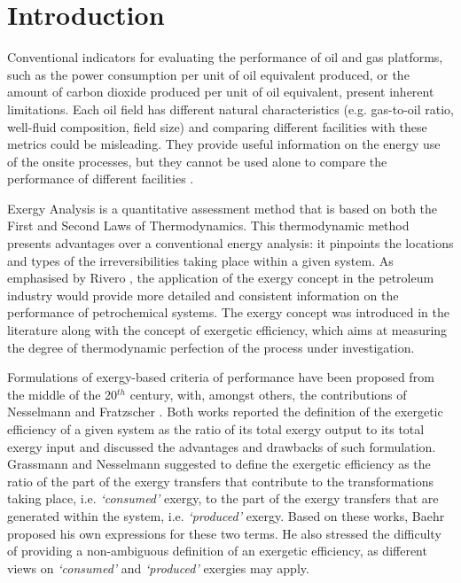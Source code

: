 

\section{Introduction}
\label{sec:introduction}
	


Conventional indicators for evaluating the performance of oil and gas platforms, such as the power consumption per unit of oil equivalent produced, or the amount of carbon dioxide produced per unit of oil equivalent, present inherent limitations. Each oil field has different natural characteristics (e.g. gas-to-oil ratio, well-fluid composition, field size) and comparing different facilities with these metrics could be misleading. They provide useful information on the energy use of the onsite processes, but they cannot be used alone to compare the performance of different facilities \cite{Svalheim2002,Svalheim2003}.

Exergy Analysis is a quantitative assessment method that is based on both the First and Second Laws of Thermodynamics. This thermodynamic method presents advantages over a conventional energy analysis: it pinpoints the locations and types of the irreversibilities taking place within a given system. As emphasised by Rivero \cite{Rivero2002}, the application of the exergy concept in the petroleum industry would provide more detailed and consistent information on the performance of petrochemical systems. The exergy concept was introduced in the literature along with the concept of exergetic efficiency, which aims at measuring the degree of thermodynamic perfection of the process under investigation.  

Formulations of exergy-based criteria of performance have been proposed from the middle of the 20$^{th}$ century, with, amongst others, the contributions of Nesselmann \cite{Nesselmann1952} and Fratzscher \cite{Fratzscher1981,Fratzscher1986}. Both works reported the definition of the exergetic efficiency of a given system as the ratio of its total exergy output to its total exergy input and discussed the advantages and drawbacks of such formulation. Grassmann \cite{Grassmann1950} and Nesselmann \cite{Nesselmann1953} suggested to define the exergetic efficiency as the ratio of the part of the exergy transfers that contribute to the transformations taking place, i.e. \emph{`consumed'} exergy, to the part of the exergy transfers that are generated within the system, i.e. \emph{`produced'} exergy. Based on these works, Baehr \cite{Baehr1965,Baehr1968} proposed his own expressions for these two terms. He also stressed the difficulty of providing a non-ambiguous definition of an exergetic efficiency, as different views on \emph{`consumed'} and \emph{`produced'} exergies may apply.

